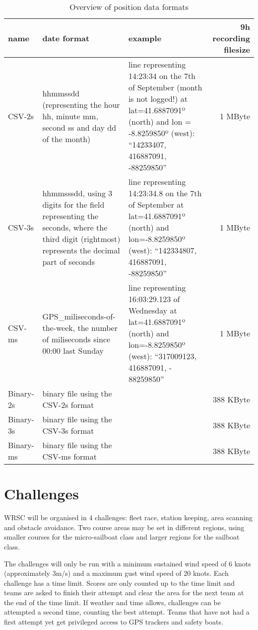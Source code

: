 \documentclass[12pt]{article}
\begin{document}
\begin{landscape}
\centering
\begin{table}
\small{
\begin{tabular}{l|p{6cm}|p{8cm}|r}
name   & date format & example & 9h recording filesize\\
\hline
CSV-2s & hhmmssdd (representing
the hour hh, minute mm, second ss and day dd of the month) &
line representing 14:23:34 on the 7th of September (month is not logged!) at lat=41.6887091º (north) and lon = -8.8259850º (west):
``14233407, 416887091, -88259850'' &
1 MByte\\ \hline

CSV-3s & hhmmsssdd, using 3 digits for the field representing the
seconds, where the third digit (rightmost) represents the decimal part of
seconds & line representing 14:23:34.8 on the 7th of September at
lat=41.6887091º (north) and lon=-8.8259850º (west):
``142334807, 416887091, -88259850''&
1 MByte \\ \hline

CSV-ms & GPS\_miliseconds-of-the-week, the number of miliseconds since 00:00 last Sunday &
line representing 16:03:29.123 of Wednesday at
lat=41.6887091º (north) and lon=-8.8259850º (west):
 “317009123, 416887091, - 88259850”&
1 MByte\\ \hline

Binary-2s &
binary file using the CSV-2s format&
&
388 KByte \\ \hline

Binary-3s &
binary file using the CSV-3s format&
&
388 KByte\\ \hline

Binary-ms &
binary file using the CSV-ms format &
&
388 KByte\\ \hline
\end{tabular}
}
\caption{Overview of position data formats}
\label{tab:dataformats}
\end{table}
\end{landscape}



\section{Challenges}
WRSC will be organised in 4 challenges: fleet race, station keeping, area
scanning and obstacle avoidance.
Two course areas may be set in different regions, using smaller courses for the
micro-sailboat class and larger regions for the sailboat class. 

The challenges will only be run with a minimum sustained wind speed of 6 knots
(approximately 3m/s) and a maximum gust wind speed of 20 knots.
Each challenge has a time limit. Scores are only counted up to the time limit 
and teams are asked to finish their attempt and clear the area for the next team 
at the end of the time limit. 
If weather and time allows, challenges can be attempted a
second time, counting the best attempt. Teams that have not had a
first attempt yet get privileged access to GPS trackers and safety boats.
\end{document}
